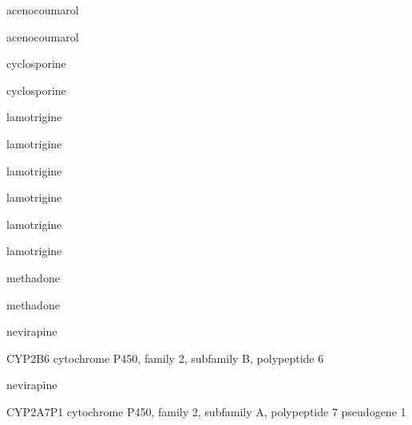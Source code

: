 \documentclass{resume} %
\begin{document}
\begin{rSection}{ acenocoumarol }
\begin{rSection}{ acenocoumarol }
\begin{rSection}{ cyclosporine }
\begin{rSection}{ cyclosporine }
\begin{rSection}{ lamotrigine }
\begin{rSection}{ lamotrigine }
\begin{rSection}{ lamotrigine }
\begin{rSection}{ lamotrigine }
\begin{rSection}{ lamotrigine }
\begin{rSection}{ lamotrigine }
\begin{rSection}{ methadone }
\begin{rSection}{ methadone }
\end{rSection}
\begin{rSection}{ nevirapine }
\item[]
\begin{rSubsection}{ CYP2B6 }{ cytochrome P450, family 2, subfamily B, polypeptide 6 }{}{}
\item[]


\end{rSubsection}
\begin{rSection}{ nevirapine }
\item[]
\begin{rSubsection}{ CYP2A7P1 }{ cytochrome P450, family 2, subfamily A, polypeptide 7 pseudogene 1 }{}{}
\item[]


\end{rSubsection}


\end{rSection}
\end{rSection}
\end{rSection}
\end{rSection}
\end{rSection}
\end{rSection}
\end{rSection}
\end{rSection}
\end{rSection}
\end{rSection}
\end{rSection}
\end{rSection}
\end{rSection}
\end{document}
